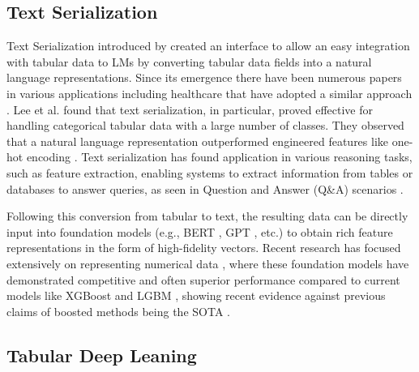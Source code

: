\documentclass{article}
\theoremstyle{plain}
\theoremstyle{definition}
\theoremstyle{remark}
\begin{document}
\subsection{Text Serialization}

Text Serialization introduced by \cite{hegselmann2023tabllm, dinh2022lift,gidroltext, jaitly2023better} created an interface to allow an easy integration with tabular data to LMs by converting tabular data fields into a natural language representations. Since its emergence there have been numerous papers in various applications including healthcare that have adopted a similar approach \cite{chen2024multimodal,kim2024health,hegselmann2024data,belyaeva2023multimodal}. Lee et al. found that text serialization, in particular, proved effective for handling categorical tabular data with a large number of classes. They observed that a natural language representation outperformed engineered features like one-hot encoding \citep{lee2024multimodal}. Text serialization has found application in various reasoning tasks, such as feature extraction, enabling systems to extract information from tables or databases to answer queries, as seen in Question and Answer (Q\&A) scenarios \cite{min2024exploring, sui2024table, li2024can}.

Following this conversion from tabular to text, the resulting data can be directly input into foundation models (e.g., BERT \cite{devlin2018bert}, GPT \cite{brown2020language}, etc.) to obtain rich feature representations in the form of high-fidelity vectors. Recent research has focused extensively on representing numerical data \cite{gorishniy2022embeddings, golkar2023xval}, where these foundation models have demonstrated competitive and often superior performance compared to current models like XGBoost \cite{chen2016xgboost} and LGBM \cite{ke2017lightgbm}, showing recent evidence against previous claims of boosted methods being the SOTA \cite{grinsztajn2022tree}.

\subsection{Tabular Deep Leaning}
\end{document}
